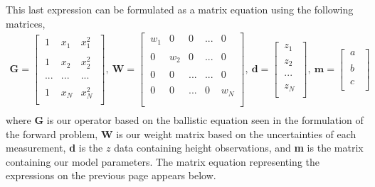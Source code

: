 \documentclass[12pt,runningheads]{article}
\begin{document}
This last expression can be formulated as a matrix equation using the following matrices,
\begin{align*}
\textbf{G}= 
\begin{bmatrix}
\ 1 & x_{1} & x_{1}^2\ \ \\ \\
\ 1 & x_{2} & x_{2}^2\ \ \\ \\
\ ... & ... & ...\ \ \\ \\
\ 1 & x_{N} & x_{N}^2\ \\
\end{bmatrix},\ 
\textbf{W}= 
\begin{bmatrix}
\ w_{1} & 0 & 0 & ... &  0\ \ \\ \\
\ 0 & w_{2} & 0 & ... & 0\ \ \\ \\
\ 0 & 0 & ... & ... & 0 \ \ \\ \\
\ 0 & 0 & ... & 0 & w_{N} \\ \\
\end{bmatrix},\ 
\textbf{d}= 
\begin{bmatrix}
\ z_{1} \ \\ \\
\ z_{2} \ \\ \\
\ ... \ \\ \\
\ z_{N} \ \\
\end{bmatrix},\ 
\textbf{m}= 
\begin{bmatrix}
\ a \ \ \\ \\
\ b \ \ \\ \\
\ c \ \ \\
\end{bmatrix} \\
\end{align*}
where \textbf{G} is our operator based on the ballistic equation seen in the formulation of the forward problem, \textbf{W} is our weight matrix based on the uncertainties of each measurement, \textbf{d} is the $z$ data containing height observations, and \textbf{m} is the matrix containing our model parameters. The matrix equation representing the expressions on the previous page appears below.\\
\end{document}
